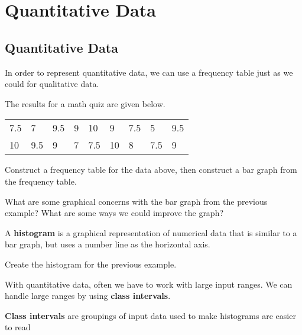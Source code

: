 \documentclass[notes]{subfiles}
\begin{document}
	\fancyhead[LO,RE]{\bfseries \currentname}
	\fancyfoot[C]{{}}
	\fancyfoot[RO,LE]{\large \thepage}	%

\section*{Quantitative Data}\label{quantdata}
	\subsection*{Quantitative Data}	
		In order to represent quantitative data, we can use a frequency table just as we could for qualitative data.

		\begin{ex}
			The results for a math quiz are given below.
			{
				\begin{center}
					\begin{tabular}{lllllllll}
						7.5&7&9.5&9&10&9&7.5&5&9.5 \\
						10&9.5&9&7&7.5&10&8&7.5&9
					\end{tabular}
				\end{center}
			}
			Construct a frequency table for the data above, then construct a bar graph from the frequency table.
		\end{ex}

		\begin{question}
			What are some graphical concerns with the bar graph from the previous example?  What are some ways we could improve the graph?
		\end{question}
			\newpage

		\begin{defn}[Histogram]
			A \textbf{histogram} is a graphical representation of numerical data that is similar to a bar graph, but uses a number line as the horizontal axis.
		\end{defn}

		\begin{ex}
			Create the histogram for the previous example.
		\end{ex}

		With quantitative data, often we have to work with large input ranges.  We can handle large ranges by using \textbf{class intervals}.

		\begin{defn}
			\textbf{Class intervals} are groupings of input data used to make histograms are easier to read
		\end{defn}
\end{document}
